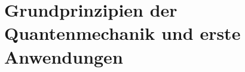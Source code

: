 \chapter{Grundprinzipien der Quantenmechanik und erste Anwendungen} %
\label{Grundprinzipien_der_Quantenmechanik_und_erste_Anwendungen}




